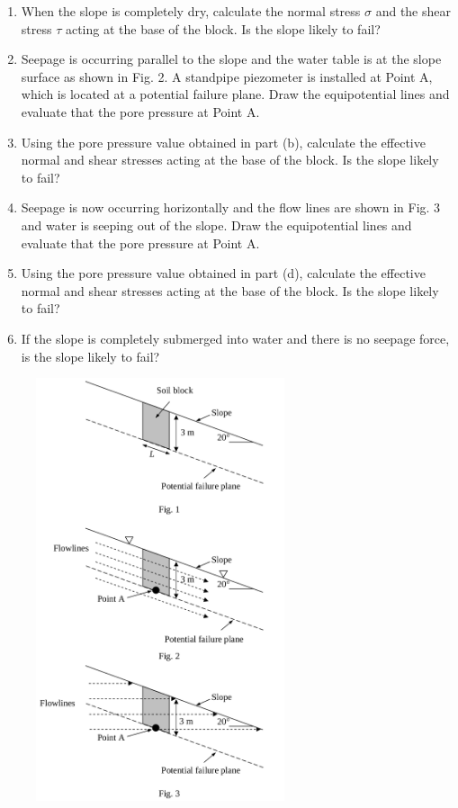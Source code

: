\documentclass[a4paper,12pt]{article}
\begin{document}
\begin{enumerate}
	\begin{enumerate}
		\item When the slope is completely dry, calculate the normal stress $\sigma$ and the shear stress $\tau$ acting at the base of the block. Is the slope likely to fail?
		\item Seepage is occurring parallel to the slope and the water table is at the slope surface as shown in Fig. 2. A standpipe piezometer is installed at Point A, which is located at a potential failure plane. Draw the equipotential lines and evaluate that the pore pressure at Point A.
		\item Using the pore pressure value obtained in part (b), calculate the effective normal
		and shear stresses acting at the base of the block. Is the slope likely to fail?
		\item Seepage is now occurring horizontally and the flow lines are shown in Fig. 3 and
		water is seeping out of the slope. Draw the equipotential lines and evaluate that the pore
		pressure at Point A.
		\item Using the pore pressure value obtained in part (d), calculate the effective normal
		and shear stresses acting at the base of the block. Is the slope likely to fail?
		\item If the slope is completely submerged into water and there is no seepage force, is the slope likely to fail? 
	\end{enumerate}

	\begin{figure}[!h]
		\centering
		\includegraphics[width=0.65\textwidth]{figs/slopes.png}
	\end{figure}
	

\end{enumerate}
\end{document}
